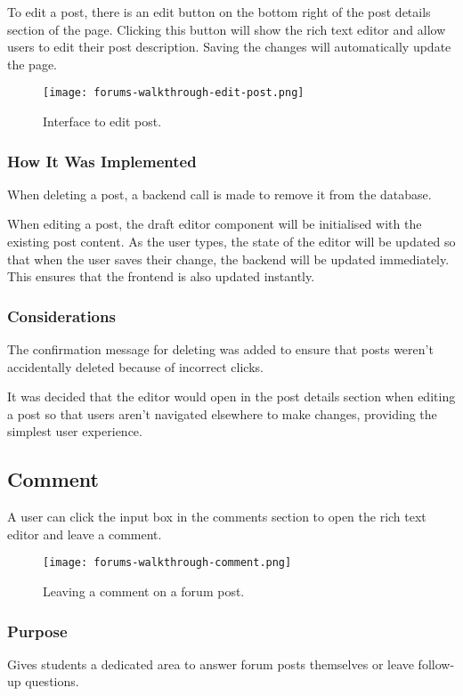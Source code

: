To edit a post, there is an edit button on the bottom right of the post details section of the page.
Clicking this button will show the rich text editor and allow users to edit their post description.
Saving the changes will automatically update the page.

\begin{figure}[h!]
    \texttt{[image: forums-walkthrough-edit-post.png]}
    \centering
    \caption{Interface to edit post.}
\end{figure}

\subsubsection{How It Was Implemented}
When deleting a post, a backend call is made to remove it from the database.

When editing a post, the draft editor component will be initialised with the existing post content.
As the user types, the state of the editor will be updated so that when the user saves their change, the backend will be updated immediately.
This ensures that the frontend is also updated instantly.

\subsubsection{Considerations}
The confirmation message for deleting was added to ensure that posts weren't accidentally deleted because of incorrect clicks.

It was decided that the editor would open in the post details section when editing a post so that users aren't navigated elsewhere to make changes, providing the simplest user experience.

\subsection{Comment}
A user can click the input box in the comments section to open the rich text editor and leave a comment.

\begin{figure}[h!]
    \texttt{[image: forums-walkthrough-comment.png]}
    \centering
    \caption{Leaving a comment on a forum post.}
\end{figure}

\subsubsection{Purpose}
Gives students a dedicated area to answer forum posts themselves or leave follow-up questions.

